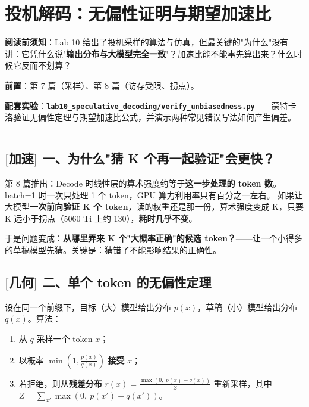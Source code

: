 \chapter{投机解码：无偏性证明与期望加速比}

\begin{noteBox}[核心导读与背景]
\textbf{阅读前须知}：Lab 10 给出了投机采样的算法与仿真，但最关键的"为什么"没有讲：它凭什么说"\textbf{输出分布与大模型完全一致}"？加速比能不能事先算出来？什么时候它反而不划算？

\textbf{前置}：第 7 篇（采样）、第 8 篇（访存受限、拐点）。

\textbf{配套实验}：\textbf{\texttt{lab10\_speculative\_decoding/verify\_unbiasedness.py}}——蒙特卡洛验证无偏性定理与期望加速比公式，并演示两种常见错误写法如何产生偏差。
\end{noteBox}

\vspace{0.8em}\hrule\vspace{0.8em}

\section{[加速] 一、为什么"猜 K 个再一起验证"会更快？}

第 8 篇推出：Decode 时线性层的算术强度约等于\textbf{这一步处理的 token 数}。batch=1 时一次只处理 1 个 token，GPU 算力利用率只有百分之一左右。
如果让大模型\textbf{一次前向验证 K 个 token}，读的权重还是那一份，算术强度变成 K，只要 K 远小于拐点（5060 Ti 上约 130），\textbf{耗时几乎不变}。

于是问题变成：\textbf{从哪里弄来 K 个"大概率正确"的候选 token？}——让一个小得多的草稿模型先猜。关键是：猜错了不能影响结果的正确性。

\section{[几何] 二、单个 token 的无偏性定理}

设在同一个前缀下，目标（大）模型给出分布 $p(x)$，草稿（小）模型给出分布 $q(x)$。算法：
\begin{enumerate}
  \item 从 $q$ 采样一个 token $x$；
  \item 以概率 $\min\left(1, \frac{p(x)}{q(x)}\right)$ \textbf{接受} $x$；
  \item 若拒绝，则从\textbf{残差分布} $r(x) = \frac{\max(0, \ p(x) - q(x))}{Z}$ 重新采样，其中 $Z = \sum_{x'} \max(0, \ p(x') - q(x'))$。
\end{enumerate}

